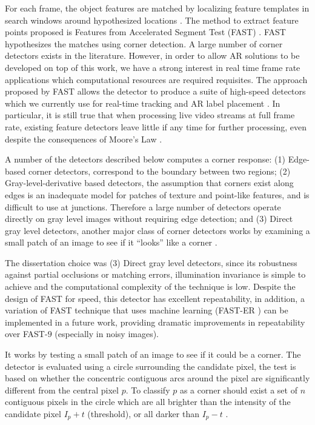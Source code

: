 For each frame, the object features are matched by localizing feature templates in search windows around hypothesized locations \cite{Lepetit2005}. The method to extract feature points proposed is Features from Accelerated Segment Test (FAST) \cite{Rosten2010}. FAST \cite{RostenFaster2010} hypothesizes the matches using corner detection. A large number of corner detectors exists in the literature. However, in order to allow AR solutions to be developed on top of this work, we have a strong interest in real time frame rate applications which computational resources are required requisites. The approach proposed by FAST allows the detector to produce a suite of high-speed detectors which we currently use for real-time tracking and AR label placement \cite{Calonder2010}. In particular, it is still true that when processing live video streams at full frame rate, existing feature detectors leave little if any time for further processing, even despite the consequences of Moore's Law \cite{Rosten2010}.

A number of the detectors described below computes a corner response: (1) Edge-based corner detectors, correspond to the boundary between two regions; (2) Gray-level-derivative based detectors, the assumption that corners exist along edges is an inadequate model for patches of texture and point-like features, and is difficult to use at junctions. Therefore a large number of detectors operate directly on gray level images without requiring edge detection; and (3) Direct gray level detectors, another major class of corner detectors works by examining a small patch of an image to see if it ``looks'' like a corner \cite{Rosten2010}.

The dissertation choice was (3) Direct gray level detectors, since its robustness against partial occlusions or matching errors, illumination invariance is simple to achieve and the computational complexity of the technique is low.
Despite the design of FAST for speed, this detector has excellent repeatability, in addition, a variation of FAST technique that uses machine learning (FAST-ER \cite{RostenFaster2010}) can be implemented in a future work, providing dramatic improvements in repeatability over FAST-$9$ (especially in noisy images).

It works by testing a small patch of an image to see if it could be a corner. The detector is evaluated using a circle surrounding the candidate pixel, the test is based on whether the concentric contiguous arcs around the pixel are significantly different from the central pixel $p$. To classify $p$ as a corner should exist a set of $n$ contiguous pixels in the circle which are all brighter than the intensity of the candidate pixel $I_{p} + t$ (threshold), or all darker than $I_{p} - t$ \cite{Rosten2010}.

